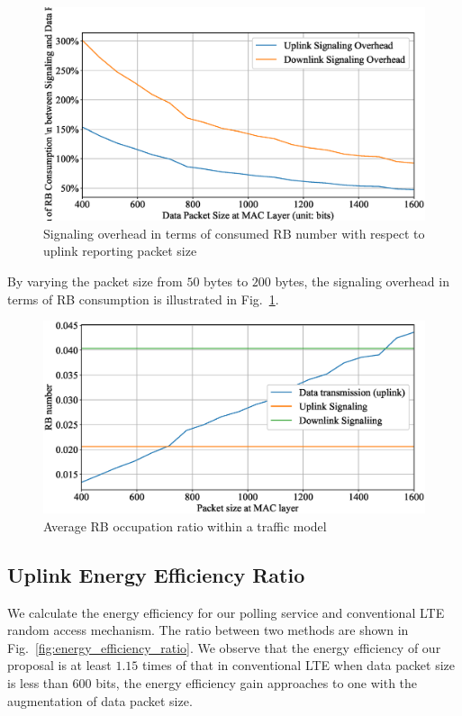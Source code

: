 



\begin{figure}[!t]
	\centering
	\includegraphics[width=\linewidth]{Chapter6/Figures/signaling_overhead_ratio.eps}
	\caption{Signaling overhead in terms of consumed RB number with respect to uplink reporting packet size}
	\label{fig:RB_signaling_overhead}
\end{figure}
By varying the packet size from $50$ bytes to $200$ bytes, the signaling overhead in terms of RB consumption is illustrated in Fig.~\ref{fig:RB_signaling_overhead}.

\begin{figure}[!t]
	\centering
	\includegraphics[width=\linewidth]{Chapter6/Figures/system_capa_occup_ratio.eps}
	\caption{ Average RB occupation ratio within a traffic model~\cite[Annex E]{3GPP/cellularIoT}}
	\label{fig:system_capa_occup_ratio}
\end{figure}

\subsection{Uplink Energy Efficiency Ratio}
We calculate the energy efficiency for our polling service and conventional LTE random access mechanism. The ratio between two methods are shown in Fig.~\ref{fig:energy_efficiency_ratio}.
We observe that the energy efficiency of our proposal is at least $1.15$ times of that in conventional LTE when data packet size is less than $600$ bits, the energy efficiency gain approaches to one with the augmentation of data packet size.

